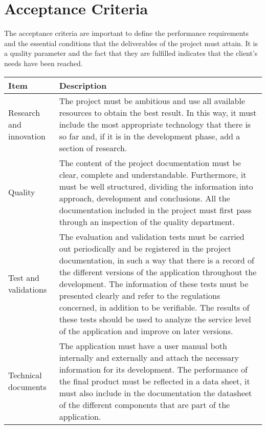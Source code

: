 \section{Acceptance Criteria}

The acceptance criteria are important to define the performance requirements and the essential conditions that the deliverables of the project must attain. It is a quality parameter and the fact that they are fulfilled indicates that the client's needs have been reached.

\begin{longtable}[H]{ p{4cm} p{10cm} }
	
	\toprule[2pt]
	
	\textbf{Item} & \textbf{Description} \\ 
	
	\midrule[1.5pt] \endhead
	
	Research and innovation & The project must be ambitious and use all available resources to obtain the best result. In this way, it must include the most appropriate technology that there is so far and, if it is in the development phase, add a section of research. \\ 
	
	\hline
	
	Quality & The content of the project documentation must be clear, complete and understandable. Furthermore, it must be well structured, dividing the information into approach, development and conclusions. \newline
	All the documentation included in the project must first pass through an inspection of the quality department. \\ 
	
	\hline
	
	Test and validations & The evaluation and validation tests must be carried out periodically and be registered in the project documentation, in such a way that there is a record of the different versions of the application throughout the development. \newline
	The information of these tests must be presented clearly and refer to the regulations concerned, in addition to be verifiable. \newline
	The results of these tests should be used to analyze the service level of the application and improve on later versions. \\
	
	\hline
	
	Technical documents & The application must have a user manual both internally and externally and attach the necessary information for its development. \newline
	The performance of the final product must be reflected in a data sheet, it must also include in the documentation the datasheet of the different components that are part of the application. \\
	

\end{longtable}
